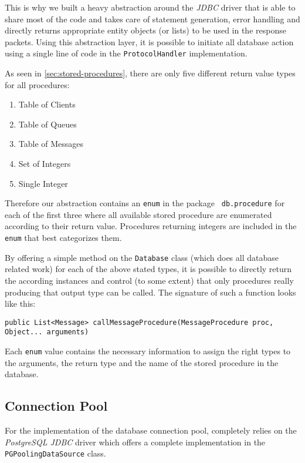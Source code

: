 \documentclass[a4paper, oneside]{csthesis}
\begin{document}
    This is why we built a heavy abstraction around the {\it JDBC} driver that
    is able to share most of the code and takes care of statement generation,
    error handling and directly returns appropriate entity objects (or lists) to
    be used in the response packets. Using this abstraction layer, it is
    possible to initiate all database action using a single line of code in the
    {\tt ProtocolHandler} implementation.
    
    As seen in \cref{sec:stored-procedures}, there are only five different
    return value types for all procedures:
    
    \begin{enumerate}
        \item Table of Clients
        \item Table of Queues
        \item Table of Messages
        \item Set of Integers
        \item Single Integer
    \end{enumerate}
    
    Therefore our abstraction contains an {\tt enum} in the package {\tt
    db.procedure} for each of the first three where all available stored
    procedure are enumerated according to their return value. Procedures
    returning integers are included in the {\tt enum} that best categorizes
    them.
    
    By offering a simple method on the {\tt Database} class (which does all
    database related work) for each of the above stated types, it is possible to
    directly return the according instances and control (to some extent) that
    only procedures really producing that output type can be called. The
    signature of such a function looks like this:
    
    \begin{center}
        {\tt public List<Message> callMessageProcedure(MessageProcedure proc,
        Object... arguments)}
    \end{center}

    Each {\tt enum} value contains the necessary information to assign the
    right types to the arguments, the return type and the name of the stored
    procedure in the database.
    
\subsection{Connection Pool}
    For the implementation of the database connection pool, \telesto{}
    completely relies on the {\it PostgreSQL JDBC} driver which
    offers a complete implementation in the {\tt
    PGPoolingDataSource}
    class.
\end{document}
